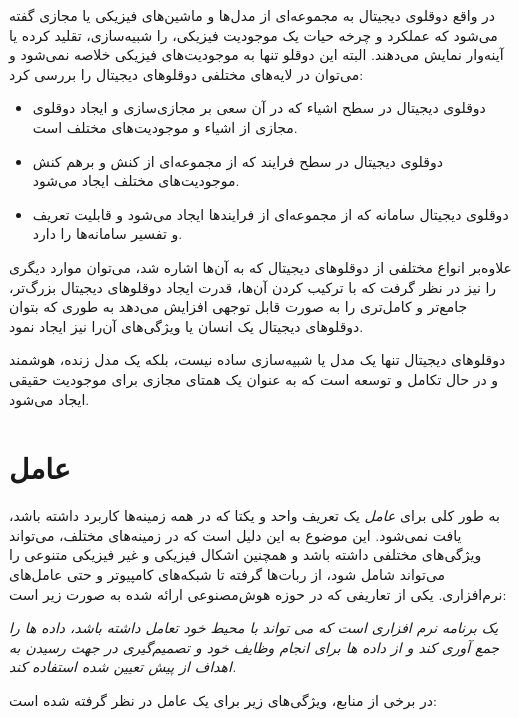 در واقع دوقلوی دیجیتال به مجموعه‌ای از مدل‌‌ها و ماشین‌های فیزیکی یا مجازی گفته می‌شود که عملکرد و چرخه حیات یک موجودیت فیزیکی، را شبیه‌سازی، تقلید کرده یا آینه‌وار نمایش می‌دهند. البته این دوقلو تنها به موجودیت‌های فیزیکی خلاصه نمی‌شود و می‌توان در لایه‌های مختلفی دوقلو‌های دیجیتال را بررسی کرد:
\begin{itemize}
	\item 
	دوقلوی دیجیتال در سطح اشیاء که در آن سعی بر مجازی‌سازی و ایجاد دوقلوی مجازی از اشیاء و موجودیت‌های مختلف است.
	\item 
	دوقلوی دیجیتال در سطح فرایند که از مجموعه‌ای از کنش‌ و برهم‌ کنش موجودیت‌های مختلف ایجاد می‌شود.
	\item 
	دوقلوی دیجیتال سامانه که از مجموعه‌ای از فرایند‌ها ایجاد می‌شود و قابلیت تعریف و تفسیر سامانه‌ها را دارد.
\end{itemize}

علاوه‌بر انواع مختلفی از دوقلو‌های دیجیتال که به آن‌ها اشاره شد، می‌توان موارد دیگری را نیز در نظر گرفت که با ترکیب کردن آن‌ها، قدرت ایجاد دوقلو‌های دیجیتال بزرگ‌تر، جامع‌تر و کامل‌تری را به صورت قابل توجهی افزایش می‌دهد به طوری که بتوان دوقلو‌های دیجیتال یک انسان یا ویژگی‌های آن‌را نیز ایجاد نمود.

دوقلوهای دیجیتال تنها یک مدل یا شبیه‌سازی ساده نیست، بلکه یک مدل زنده،‌ هوشمند و در حال تکامل و توسعه است که به عنوان یک همتای مجازی برای موجودیت حقیقی ایجاد می‌شود.

\section{عامل}

به طور کلی برای 
\textit{عامل}
یک تعریف واحد و یکتا که در همه زمینه‌ها کاربرد داشته باشد، یافت نمی‌شود. این موضوع به این دلیل است که در زمینه‌های مختلف، می‌تواند ویژگی‌های مختلفی داشته باشد و همچنین اشکال فیزیکی و غیر فیزیکی متنوعی را می‌تواند شامل شود، از ربات‌ها گرفته تا شبکه‌های کامپیوتر و حتی عامل‌های نرم‌افزاری.
یکی از تعاریفی که در حوزه هوش‌مصنوعی ارائه شده به صورت زیر است:

\textit{
	یک برنامه نرم افزاری است که می تواند با محیط خود تعامل داشته باشد، داده ها را جمع آوری کند و از داده ها برای انجام وظایف خود و تصمیم‌گیری در جهت رسیدن به اهداف از پیش تعیین شده استفاده کند.}
\cite{b4}

در برخی‌ از منابع، ویژگی‌های زیر برای یک عامل در نظر گرفته شده است:
\cite{b5}


